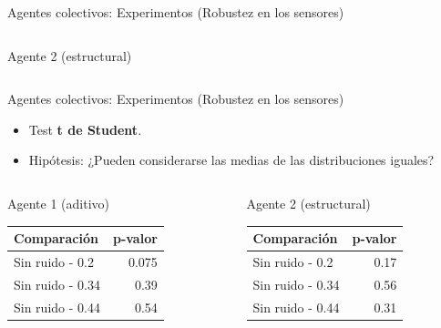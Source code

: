 \documentclass[aspectratio=169]{beamer}
\begin{document}
\begin{frame}{Agentes colectivos: Experimentos (Robustez en los sensores)}
\begin{columns}
\begin{column}{0.5\textwidth}
\begin{block}{Agente 2 (estructural)}
      \end{block}
    \end{column}
  \end{columns}
\end{frame}

\begin{frame}{Agentes colectivos: Experimentos (Robustez en los sensores)}
  \begin{itemize}
    \item Test \textbf{t de Student}.
    \item Hipótesis: ¿Pueden considerarse las medias de las distribuciones iguales?
  \end{itemize}
  \begin{columns}
    \begin{column}{0.47\textwidth}
      \begin{block}{Agente 1 (aditivo)}
        \begin{table}
         \begin{tabular}{lr}
           \toprule
           Comparación & p-valor\\
           \midrule
           Sin ruido - 0.2 & 0.075\\
           Sin ruido - 0.34 & 0.39\\
           Sin ruido - 0.44 & 0.54\\
           \bottomrule
         \end{tabular}
       \end{table}
    \end{block}
    \end{column}
    \begin{column}{0.5\textwidth}
      \begin{block}{Agente 2 (estructural)}
        \begin{table}
         \begin{tabular}{lr}
           \toprule
           Comparación & p-valor\\
           \midrule
           Sin ruido - 0.2 & 0.17\\
           Sin ruido - 0.34 & 0.56\\
           Sin ruido - 0.44 & 0.31\\
           \bottomrule
         \end{tabular}
       \end{table}
      \end{block}
    \end{column}
  \end{columns}
\end{frame}
\end{document}
